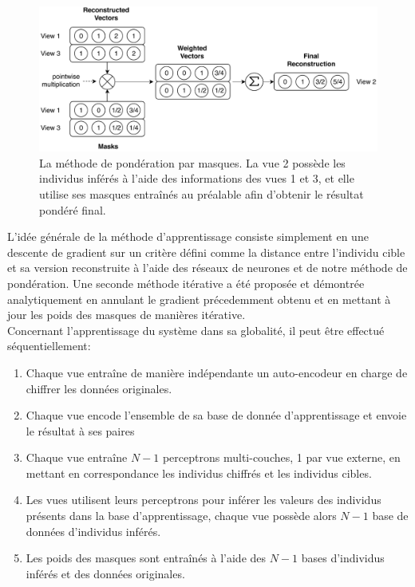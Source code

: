 	\begin{figure}[H]
		\centering
		\includegraphics[width=\textwidth]{img/mwm.pdf}
        \caption{La méthode de pondération par masques. La vue 2 possède les individus inférés à l'aide des informations des vues 1 et 3, et elle utilise ses masques entraînés au préalable afin d'obtenir le résultat pondéré final.}
\label{sum_fig:sum_mwm}
	\end{figure}

    L'idée générale de la méthode d'apprentissage consiste simplement en une descente de gradient sur un critère défini comme la distance entre l'individu cible et sa version reconstruite à l'aide des réseaux de neurones et de notre méthode de pondération. Une seconde méthode itérative a été proposée et démontrée analytiquement en annulant le gradient précedemment obtenu et en mettant à jour les poids des masques de manières itérative.\\

    Concernant l'apprentissage du système dans sa globalité, il peut être effectué séquentiellement:
    \begin{enumerate}
        \item Chaque vue entraîne de manière indépendante un auto-encodeur en charge de chiffrer les données originales.
        \item Chaque vue encode l'ensemble de sa base de donnée d'apprentissage et envoie le résultat à ses paires
        \item Chaque vue entraîne $N-1$ perceptrons multi-couches, 1 par vue externe, en mettant en correspondance les individus chiffrés et les individus cibles.
        \item Les vues utilisent leurs perceptrons pour inférer les valeurs des individus présents dans la base d'apprentissage, chaque vue possède alors $N-1$ base de données d'individus inférés.
        \item Les poids des masques sont entraînés à l'aide des $N-1$ bases d'individus inférés et des données originales.\\
    \end{enumerate}

